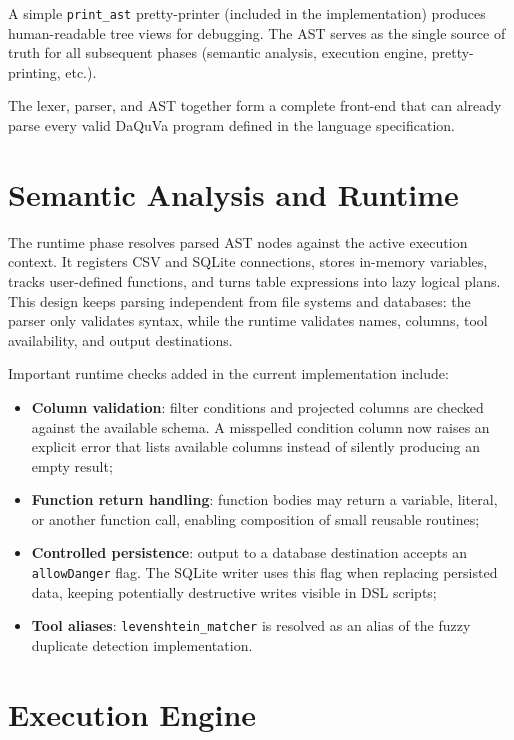 A simple \texttt{print\_ast} pretty-printer (included in the implementation) produces human-readable tree views for debugging. The AST serves as the single source of truth for all subsequent phases (semantic analysis, execution engine, pretty-printing, etc.).

The lexer, parser, and AST together form a complete front-end that can already parse every valid DaQuVa program defined in the language specification.

\section{Semantic Analysis and Runtime}

The runtime phase resolves parsed AST nodes against the active execution
context. It registers CSV and SQLite connections, stores in-memory variables,
tracks user-defined functions, and turns table expressions into lazy logical
plans. This design keeps parsing independent from file systems and databases:
the parser only validates syntax, while the runtime validates names, columns,
tool availability, and output destinations.

Important runtime checks added in the current implementation include:

\begin{itemize}[label=-, noitemsep]
    \item \textbf{Column validation}: filter conditions and projected columns
          are checked against the available schema. A misspelled condition
          column now raises an explicit error that lists available columns
          instead of silently producing an empty result;
    \item \textbf{Function return handling}: function bodies may return a
          variable, literal, or another function call, enabling composition of
          small reusable routines;
    \item \textbf{Controlled persistence}: output to a database destination
          accepts an \texttt{allowDanger} flag. The SQLite writer uses this
          flag when replacing persisted data, keeping potentially destructive
          writes visible in DSL scripts;
    \item \textbf{Tool aliases}: \texttt{levenshtein\_matcher} is resolved as
          an alias of the fuzzy duplicate detection implementation.
\end{itemize}

\section{Execution Engine}

